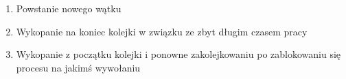 \begin{enumerate}
	\item Powstanie nowego wątku
	\item Wykopanie na koniec kolejki w związku ze zbyt długim czasem pracy
	\item Wykopanie z początku kolejki i ponowne zakolejkowaniu po zablokowaniu się procesu na jakimś wywołaniu
\end{enumerate}